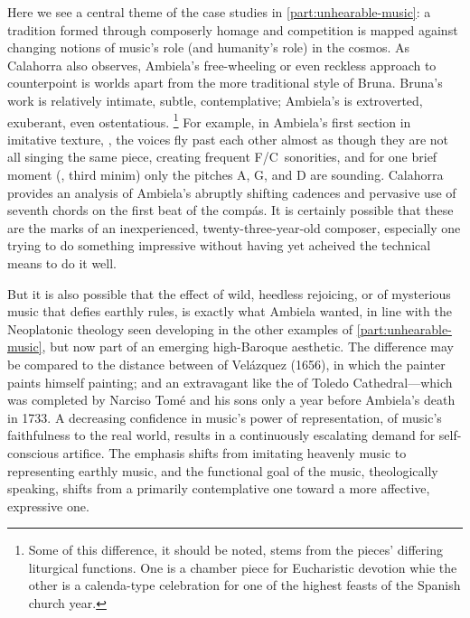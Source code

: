 Here we see a central theme of the case studies in \cref{part:unhearable-music}: a tradition formed through composerly homage and competition is mapped against changing notions of music's role (and humanity's role) in the cosmos. 
As Calahorra also observes, Ambiela's free-wheeling or even reckless approach to counterpoint is worlds apart from the more traditional style of Bruna.
Bruna's work is relatively intimate, subtle, contemplative; Ambiela's is extroverted, exuberant, even ostentatious.%
	\footnote{%
	Some of this difference, it should be noted, stems from the pieces' differing liturgical functions. 
	One is a chamber piece for Eucharistic devotion whie the other is a calenda-type celebration for one of the highest feasts of the Spanish church year.
	}
For example, in Ambiela's first section in imitative texture, , the voices fly past each other almost as though they are not all singing the same piece, creating frequent F\na/C\sh\ sonorities, and for one brief moment (, third minim) only the pitches A, G, and D are sounding.
Calahorra provides an analysis of Ambiela's abruptly shifting cadences and pervasive use of seventh chords on the first beat of the compás.
It is certainly possible that these are the marks of an inexperienced, twenty-three-year-old composer, especially one trying to do something impressive without having yet acheived the technical means to do it well.

But it is also possible that the effect of wild, heedless rejoicing, or of mysterious music that defies earthly rules, is exactly what Ambiela wanted, in line with the Neoplatonic theology seen developing in the other examples of \cref{part:unhearable-music}, but now part of an emerging high-Baroque aesthetic.
The difference may be compared to the distance between  of Velázquez (1656), in which the painter paints himself painting; and an extravagant  like the  of Toledo Cathedral---which was completed by Narciso Tomé and his sons only a year before Ambiela's death in 1733.
A decreasing confidence in music's power of representation, of music's faithfulness to the real world, results in a continuously escalating demand for self-conscious artifice.
The emphasis shifts from imitating heavenly music to representing earthly music, and the functional goal of the music, theologically speaking, shifts from a primarily contemplative one toward a more affective, expressive one.

